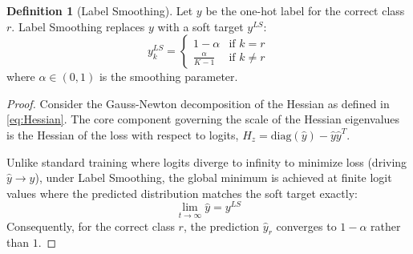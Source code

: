 \documentclass{article}
\theoremstyle{plain}
\theoremstyle{definition}
\newtheorem{definition}[theorem]{Definition}
\theoremstyle{remark}
\begin{document}
\begin{definition}
[Label Smoothing]
Let $y$ be the one-hot label for the correct class $r$. Label Smoothing replaces $y$ with a soft target $y^{LS}$:
\begin{equation}
y^{LS}_k = \begin{cases} 1 - \alpha & \text{if } k = r \\ \frac{\alpha}{K-1} & \text{if } k \neq r \end{cases}
\end{equation}
where $\alpha \in (0, 1)$ is the smoothing parameter.
\end{definition}

\begin{proof}
    Consider the Gauss-Newton decomposition of the Hessian as defined in \cref{eq:Hessian}. 
    The core component governing the scale of the Hessian eigenvalues is the Hessian of the loss with respect to logits, 
    $H_z = \text{diag}(\hat{y}) - \hat{y}\hat{y}^T$.

    Unlike standard training where logits diverge to infinity to minimize loss (driving $\hat{y} \to y$), 
    under Label Smoothing, the global minimum is achieved at finite logit values 
    where the predicted distribution matches the soft target exactly:
    \begin{equation}
    \lim_{t \to \infty} \hat{y} = y^{LS}
    \end{equation}
    Consequently, for the correct class $r$, the prediction $\hat{y}_r$ converges to $1-\alpha$ rather than $1$.


\end{proof}
\end{document}
